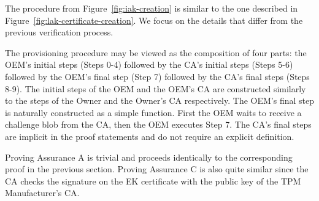 \documentclass[runningheads]{llncs}
\begin{document}



The procedure from Figure~\ref{fig:iak-creation} is similar to the one
described in Figure~\ref{fig:lak-certificate-creation}. 
We focus on the details that differ from
the previous verification process.

The provisioning procedure may be viewed as the composition of four
parts: the OEM's initial steps (Steps 0-4) followed by the CA's
initial steps (Steps 5-6) followed by the OEM's final step (Step 7)
followed by the CA's final steps (Steps 8-9). The initial steps of the
OEM and the OEM's CA are constructed similarly to the steps of the
Owner and the Owner's CA respectively.  The OEM's final step is
naturally constructed as a simple function. First the OEM waits to
receive a challenge blob from the CA, then the OEM executes Step
7. The CA's final steps are implicit in the proof statements and do
not require an explicit definition.

Proving Assurance A is trivial and proceeds identically to the
corresponding proof in the previous section. Proving Assurance C is
also quite similar since the CA checks the signature on the EK
certificate with the public key of the TPM Manufacturer's CA. 
\end{document}

